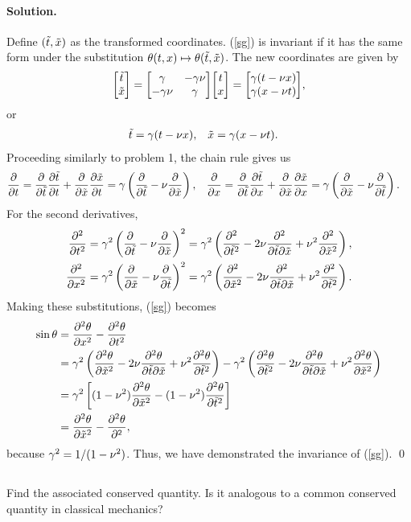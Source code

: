 \documentclass[11pt]{article}
\newcommand{\refeq}[1]{(\ref{#1})}
\newcommand{\beq}{\begin{equation*}}
\newcommand{\eeq}{\end{equation*}}
\newenvironment{problem}
{
	\subsection{}
	\color{darkgray}
    \ignorespaces
}
{

}
\newenvironment{solution}
{
    \paragraph{Solution.}
    \ignorespaces
}
{
    \bigskip
}
\begin{document}
\begin{solution}
	Define $(\tilde{t}, \tilde{x})$ as the transformed coordinates.  \refeq{sg} is invariant if it has the same form under the substitution $\theta(t, x) \mapsto \theta(\tilde{t}, \tilde{x})$.  The new coordinates are given by
	\beq
		\mqty[	\tlt \\ \xt ]
		= \mqty[	\gam & -\gam \nu \\
				-\gam \nu & \gam ]
		\mqty[	t \\ x ]
		= \mqty[	\gam (t - \nu x) \\
					\gam (x - \nu t) ],
	\eeq
	or
	\begin{align*}
		\tilde{t} &= \gamma (t - \nu x), &
		\tilde{x} &= \gamma (x - \nu t).
	\end{align*}
	Proceeding similarly to problem 1, the chain rule gives us
	\begin{align*}
		\pdv{}{t} &= \pdv{}{\tilde{t}} \pdv{\tilde{t}}{t} + \pdv{}{\tilde{x}} \pdv{\tilde{x}}{t}
		= \gamma \left( \pdv{}{\tilde{t}} - \nu \pdv{}{\tilde{x}} \right), &
		\pdv{}{x} &= \pdv{}{\tilde{t}} \pdv{\tilde{t}}{x} + \pdv{}{\tilde{x}} \pdv{\tilde{x}}{x}
		= \gamma \left( \pdv{}{\tilde{x}} - \nu \pdv{}{\tilde{t}} \right).
	\end{align*}
	For the second derivatives,
	\begin{align*}
		\pdv[2]{}{t} &= \gamma^2 \left( \pdv{}{\tilde{t}} - \nu \pdv{}{\tilde{x}} \right)^2
		= \gamma^2 \left( \pdv[2]{}{\tilde{t}} - 2 \nu \pdv{}{\tilde{t}}{\tilde{x}} + \nu^2 \pdv[2]{}{\tilde{x}} \right), \\
		\pdv[2]{}{x} &= \gamma^2 \left( \pdv{}{\tilde{x}} - \nu \pdv{}{\tilde{t}} \right)^2
		= \gamma^2 \left( \pdv[2]{}{\tilde{x}} - 2 \nu \pdv{}{\tilde{t}}{\tilde{x}} + \nu^2 \pdv[2]{}{\tilde{t}} \right).
	\end{align*}
	Making these substitutions, \refeq{sg} becomes
	\begin{align*}
		\sin{\theta} &= \pdv[2]{\theta}{x} - \pdv[2]{\theta}{t} \\
		&= \gamma^2 \left( \pdv[2]{\theta}{\tilde{x}} - 2 \nu \pdv{\theta}{\tilde{t}}{\tilde{x}} + \nu^2 \pdv[2]{\theta}{\tilde{t}} \right) - \gamma^2 \left( \pdv[2]{\theta}{\tilde{t}} - 2 \nu \pdv{\theta}{\tilde{t}}{\tilde{x}} + \nu^2 \pdv[2]{\theta}{\tilde{x}} \right) \\
		&= \gamma^2 \left[ (1 - \nu^2) \pdv[2]{\theta}{\tilde{x}} - (1 - \nu^2) \pdv[2]{\theta}{\tilde{t}} \right] \\
		&= \pdv[2]{\theta}{\tilde{x}} - \pdv[2]{\theta}{\tt},
	\end{align*}
	because $\gamma^2 = 1 / (1 - \nu^2)$.  Thus, we have demonstrated the invariance of \refeq{sg}. \qed
\end{solution}

\begin{problem}
	Find the associated conserved quantity.  Is it analogous to a common conserved quantity in classical mechanics?
\end{problem}
\end{document}
